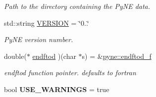 \begin{DoxyCompactItemize}
\begin{DoxyCompactList}\small\item\em Path to the directory containing the Py\+NE data. \end{DoxyCompactList}\item 
\mbox{\label{namespacepyne_a462bdf434637e275c203175076b85c36}} 
std\+::string \hyperlink{namespacepyne_a462bdf434637e275c203175076b85c36}{V\+E\+R\+S\+I\+ON} = \char`\"{}0..\char`\"{}
\begin{DoxyCompactList}\small\item\em Py\+NE version number. \end{DoxyCompactList}\item 
\mbox{\label{namespacepyne_aa938a7defc049d691fa6d84aa2c1931e}} 
double($\ast$ \hyperlink{namespacepyne_aa938a7defc049d691fa6d84aa2c1931e}{endftod} )(char $\ast$s) = \&\hyperlink{namespacepyne_a14e300f1e589b42aaa451bc3cf4c70b8}{pyne\+::endftod\+\_\+f}
\begin{DoxyCompactList}\small\item\em endftod function pointer. defaults to fortran \end{DoxyCompactList}\item 
\mbox{\label{namespacepyne_aaaed56f58559ef169cab906fac4946f8}} 
bool {\bfseries U\+S\+E\+\_\+\+W\+A\+R\+N\+I\+N\+GS} = true
\end{DoxyCompactItemize}
